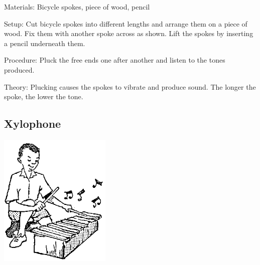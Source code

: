 \begin{multicols}{2}
\begin{description*}
\item[Materials:]{Bicycle spokes, piece of wood, pencil}
\item[Setup:]{Cut bicycle spokes into different lengths and arrange them on a piece of wood. Fix them with another spoke across as shown. Lift the spokes by inserting a pencil underneath them.}
\item[Procedure:]{Pluck the free ends one after another and listen to the tones produced.}
\item[Theory:]{Plucking causes the spokes to vibrate and produce sound. The longer the spoke, the lower the tone.}
\end{description*}

\subsection{Xylophone} 

\begin{center}
\includegraphics[width=0.4\textwidth]{./img/source/xylophone.png}
\end{center}


\end{multicols}
